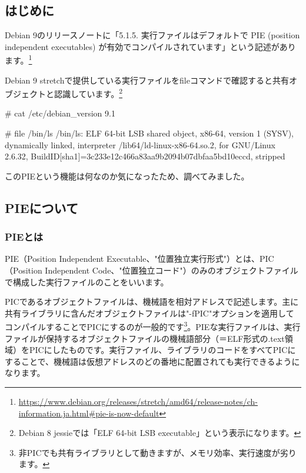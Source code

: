 \documentclass[mingoth,a4paper]{jsarticle}
\begin{document}


\subsection{はじめに}

Debian 9のリリースノートに「5.1.5. 実行ファイルはデフォルトで PIE (position independent executables) が有効でコンパイルされています」という記述があります。\footnote{\url{https://www.debian.org/releases/stretch/amd64/release-notes/ch-information.ja.html\#pie-is-now-default}}

Debian 9 stretchで提供している実行ファイルをfileコマンドで確認すると共有オブジェクトと認識しています。\footnote{Debian 8 jessieでは「ELF 64-bit LSB executable」という表示になります。}

\begin{commandline}
# cat /etc/debian_version
9.1

# file /bin/ls
/bin/ls: ELF 64-bit LSB shared object, x86-64, version 1 (SYSV), dynamically linked,
interpreter /lib64/ld-linux-x86-64.so.2, for GNU/Linux 2.6.32,
BuildID[sha1]=3c233e12c466a83aa9b2094b07dbfaa5bd10eccd, stripped
\end{commandline}

このPIEという機能は何なのか気になったため、調べてみました。


\subsection{PIEについて}

\subsubsection{PIEとは}

PIE（Position Independent Executable、"位置独立実行形式"）とは、PIC（Position Independent Code、"位置独立コード"）のみのオブジェクトファイルで構成した実行ファイルのことをいいます。


PICであるオブジェクトファイルは、機械語を相対アドレスで記述します。主に共有ライブラリに含んだオブジェクトファイルは"-fPIC"オプションを適用してコンパイルすることでPICにするのが一般的です\footnote{非PICでも共有ライブラリとして動きますが、メモリ効率、実行速度が劣ります。}。PIEな実行ファイルは、実行ファイルが保持するオブジェクトファイルの機械語部分（＝ELF形式の.text領域）をPICにしたものです。実行ファイル、ライブラリのコードをすべてPICにすることで、機械語は仮想アドレスのどの番地に配置されても実行できるようになります。
\end{document}

